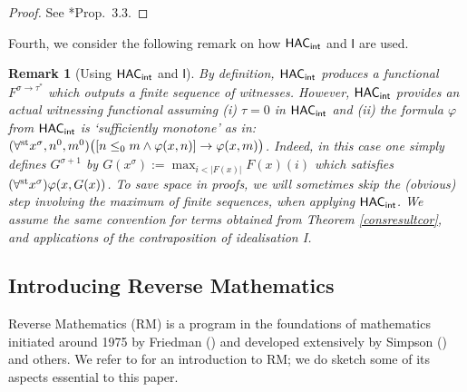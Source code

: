 \documentclass[reqno]{amsart}
\newtheorem{rem}[thm]{Remark}
\def\st{\textup{st}}
\def\di{\rightarrow}
\def\HAC{\textup{\textsf{HAC}}}
\def\INT{\textup{\textsf{int}}}
\numberwithin{equation}{section}
\numberwithin{thm}{section}
\begin{document}
\begin{proof}
See \cite{brie}*{Prop.\ 3.3}.  
\end{proof}
Fourth, we consider the following remark on how $\HAC_{\INT}$ and $\textsf{I}$ are used.  
\begin{rem}[Using $\HAC_{\INT}$ and $\textsf{I}$]\label{simply}\rm
By definition, $\HAC_{\INT}$ produces a functional $F^{\sigma\di \tau^{*}}$ which outputs a \emph{finite sequence} of witnesses.  
However, $\HAC_{\INT}$ provides an actual \emph{witnessing functional} assuming (i) $\tau=0$ in $\HAC_{\INT}$ and (ii) the formula $\varphi$ from $\HAC_{\INT}$ is `sufficiently monotone' as in: 
$(\forall^{\st} x^{\sigma},n^{0},m^{0})\big([n\leq_{0}m \wedge\varphi(x,n)] \di \varphi(x,m)\big)$.    
Indeed, in this case one simply defines $G^{\sigma+1}$ by $G(x^{\sigma}):=\max_{i<|F(x)|}F(x)(i)$ which satisfies $(\forall^{\st}x^{\sigma})\varphi(x, G(x))$.  
To save space in proofs, we will sometimes skip the (obvious) step involving the maximum of finite sequences, when applying $\HAC_{\INT}$.  %
We assume the same convention for terms obtained from Theorem \ref{consresultcor}, and applications of the contraposition of idealisation \textsf{I}.  
\end{rem}


\subsection{Introducing Reverse Mathematics}\label{RM}
Reverse Mathematics (RM) is a program in the foundations of mathematics initiated around 1975 by Friedman (\cites{fried,fried2}) and developed extensively by Simpson (\cite{simpson2, simpson1}) and others.  We refer to \cite{simpson2} for an introduction to RM; we do sketch some of its aspects essential to this paper.  

\medskip
  
\end{document}
